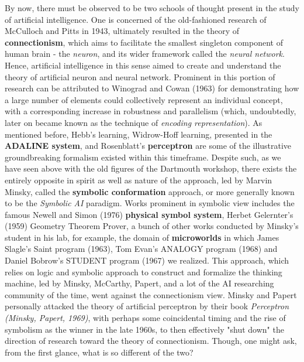 By now, there must be observed to be two schools of thought present in the study of artificial intelligence. One is concerned of the old-fashioned research of McCulloch and Pitts in 1943, ultimately resulted in the theory of \textbf{connectionism}, which aims to facilitate the smallest singleton component of human brain - the \textit{neuron}, and its wider framework called the \textit{neural network}. Hence, artificial intelligence in this sense aimed to create and understand the theory of artificial neuron and neural network. Prominent in this portion of research can be attributed to Winograd and Cowan (1963) for demonstrating how a large number of elements could collectively represent an individual concept, with a corresponding increase in robustness and parallelism (which, undoubtedly, later on became known as the technique of \textit{encoding representation}). As mentioned before, Hebb's learning, Widrow-Hoff learning, presented in the \textbf{ADALINE system}, and Rosenblatt's \textbf{perceptron} are some of the illustrative groundbreaking formalism existed within this timeframe. Despite such, as we have seen above with the old figures of the Dartmouth workshop, there exists the entirely opposite in spirit as well as nature of the approach, led by Marvin Minsky, called the \textbf{symbolic conformation} approach, or more generally known to be the \textit{Symbolic AI} paradigm. Works prominent in symbolic view includes the famous Newell and Simon (1976) \textbf{physical symbol system}, Herbet Gelernter's (1959) Geometry Theorem Prover, a bunch of other works conducted by Minsky's student in his lab, for example, the domain of \textbf{microworlds} in which James Slagle's Saint program (1963), Tom Evan's ANALOGY program (1968) and Daniel Bobrow's STUDENT program (1967) we realized.  This approach, which relies on logic and symbolic approach to construct and formalize the thinking machine, led by Minsky, McCarthy, Papert, and a lot of the AI researching community of the time, went against the connectionism view. Minsky and Papert personally attacked the theory of artificial perceptron by their book \textit{Perceptron (Minsky, Papert, 1969)}, with perhaps some coincidental timing and the rise of symbolism as the winner in the late 1960s, to then effectively "shut down" the direction of research toward the theory of connectionism. Though, one might ask, from the first glance, what is so different of the two? 


